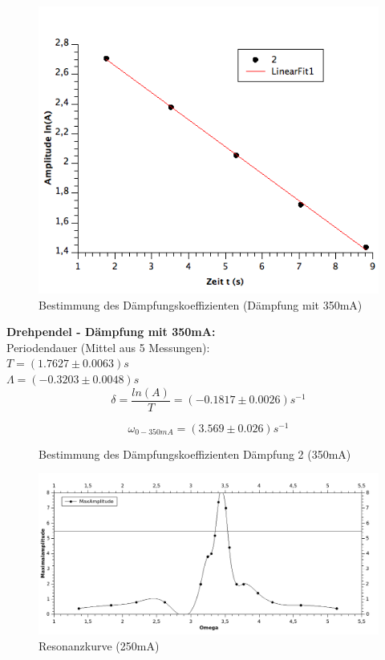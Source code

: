 \documentclass[12pt,a4paper]{article}
\begin{document}
\begin{multicols}{2}
\begin{figure}[H]
	\centering
	\includegraphics[scale=0.3]{./figure/Messung1_Daempfung_omega0-350mA.png}
	\caption{Bestimmung des Dämpfungskoeffizienten (Dämpfung mit 350mA)}
	\label{fig:daempfung_omega0_350mA}
\end{figure}

\noindent \textbf{Drehpendel - Dämpfung mit 350mA:}\\
Periodendauer (Mittel aus 5 Messungen):\\
$T = (1.7627 \pm 0.0063)s$\\
$\Lambda = (-0.3203 \pm 0.0048)s$
$$\delta = \frac{ln(A)}{T} = (-0.1817 \pm 0.0026)s^{-1}$$

$$\omega_{0 - 350mA}=(3.569 \pm 0.026)s^{-1}$$

\begin{figure}[H]
	\centering
	\caption{Bestimmung des Dämpfungskoeffizienten Dämpfung 2 (350mA)}
	\label{fig:daempfung_omega0_2}
\end{figure}

\end{multicols}

\begin{figure}[H]
	\centering
	\includegraphics[scale=4]{./figure/Messung1_Resonanzkurve_250mA.png}
	\caption{Resonanzkurve (250mA)}
	\label{fig:resonanzkurve_250mA}
\end{figure}
\end{document}

